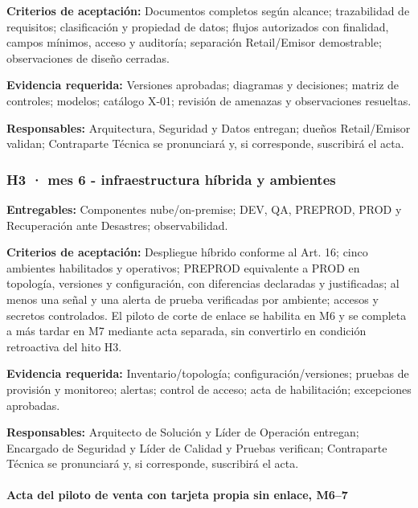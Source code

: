 \documentclass[11pt]{article}
\begin{document}
\textbf{Criterios de aceptación:} Documentos completos según alcance; trazabilidad de requisitos; clasificación y propiedad de datos; flujos autorizados con finalidad, campos mínimos, acceso y auditoría; separación Retail/Emisor demostrable; observaciones de diseño cerradas.

\textbf{Evidencia requerida:} Versiones aprobadas; diagramas y decisiones; matriz de controles; modelos; catálogo X-01; revisión de amenazas y observaciones resueltas.

\textbf{Responsables:} Arquitectura, Seguridad y Datos entregan; dueños Retail/Emisor validan; Contraparte Técnica se pronunciará y, si corresponde, suscribirá el acta.

\subsubsection{\texorpdfstring{\textbf{H3 · mes 6} - infraestructura híbrida y ambientes}{H3 · mes 6 - infraestructura híbrida y ambientes}}\label{t17-h3-mes-6-infraestructura-huxedbrida-y-ambientes}

\textbf{Entregables:} Componentes nube/on-premise; DEV, QA, PREPROD, PROD y Recuperación ante Desastres; observabilidad.

\textbf{Criterios de aceptación:} Despliegue híbrido conforme al Art. 16; cinco ambientes habilitados y operativos; PREPROD equivalente a PROD en topología, versiones y configuración, con diferencias declaradas y justificadas; al menos una señal y una alerta de prueba verificadas por ambiente; accesos y secretos controlados. El piloto de corte de enlace se habilita en M6 y se completa a más tardar en M7 mediante acta separada, sin convertirlo en condición retroactiva del hito H3.

\textbf{Evidencia requerida:} Inventario/topología; configuración/versiones; pruebas de provisión y monitoreo; alertas; control de acceso; acta de habilitación; excepciones aprobadas.

\textbf{Responsables:} Arquitecto de Solución y Líder de Operación entregan; Encargado de Seguridad y Líder de Calidad y Pruebas verifican; Contraparte Técnica se pronunciará y, si corresponde, suscribirá el acta.

\paragraph{Acta del piloto de venta con tarjeta propia sin enlace, M6--7}
\end{document}
